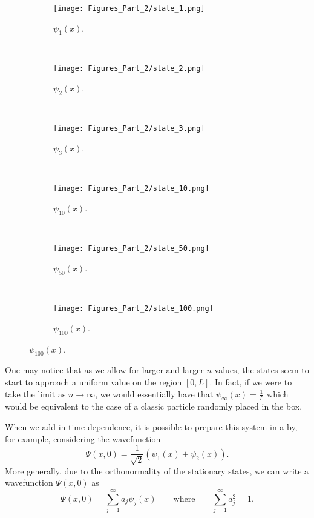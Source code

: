         \begin{figure}[H]
    \centering
    \begin{subfigure}[h]{0.3\textwidth}
        \texttt{[image: Figures\_Part\_2/state\_1.png]}
        \caption{$\psi_1(x)$.}
    \end{subfigure}
    ~
    \begin{subfigure}[h]{0.3\textwidth}
        \texttt{[image: Figures\_Part\_2/state\_2.png]}
        \caption{$\psi_2(x)$.}
    \end{subfigure}
    ~
    \begin{subfigure}[h]{0.3\textwidth}
        \texttt{[image: Figures\_Part\_2/state\_3.png]}
        \caption{$\psi_3(x)$.}
    \end{subfigure}\\

        \begin{subfigure}[h]{0.3\textwidth}
        \texttt{[image: Figures\_Part\_2/state\_10.png]}
        \caption{$\psi_{10}(x)$.}
    \end{subfigure}
    ~
    \begin{subfigure}[h]{0.3\textwidth}
        \texttt{[image: Figures\_Part\_2/state\_50.png]}
        \caption{$\psi_{50}(x)$.}
    \end{subfigure}
    ~
    \begin{subfigure}[h]{0.3\textwidth}
        \texttt{[image: Figures\_Part\_2/state\_100.png]}
        \caption{$\psi_{100}(x)$.}
    \end{subfigure}
        \end{figure}

\noindent One may notice that as we allow for larger and larger $n$ values, the states seem to start to approach a uniform value on the region $[0,L]$. In fact, if we were to take the limit as $n\to \infty$, we would essentially have that $\psi_\infty(x) = \frac{1}{L}$ which would be equivalent to the case of a classic particle randomly placed in the box.

When we add in time dependence, it is possible to prepare this system in a  by, for example, considering the wavefunction
\[
\Psi(x,0) = \frac{1}{\sqrt{2}}\left(\psi_1(x) + \psi_2(x)\right).
\]
More generally, due to the orthonormality of the stationary states, we can write a wavefunction $\Psi(x,0)$ as
\[
\boxed{\Psi(x,0)=\sum_{j=1}^\infty a_j \psi_j(x) \qquad \textrm{where}\qquad \sum_{j=1}^\infty a_j^2 = 1.}
\]

